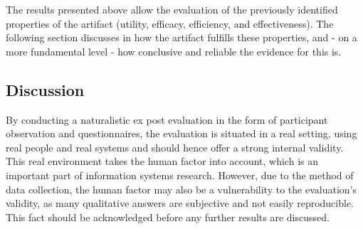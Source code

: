 
The results presented above allow the evaluation of the previously identified properties of the artifact (utility, efficacy, efficiency, and effectiveness). The following section discusses in how the artifact fulfills these properties, and - on a more fundamental level - how conclusive and reliable the evidence for this is. 

\subsection{Discussion}
By conducting a naturalistic ex post evaluation in the form of participant observation and questionnaires, the evaluation is situated in a real setting, using real people and real systems and should hence offer a strong internal validity. This real environment takes the human factor into account, which is an important part of information systems research. However, due to the method of data collection, the human factor may also be a vulnerability to the evaluation's validity, as many qualitative answers are subjective and not easily reproducible. This fact should be acknowledged before any further results are discussed.

